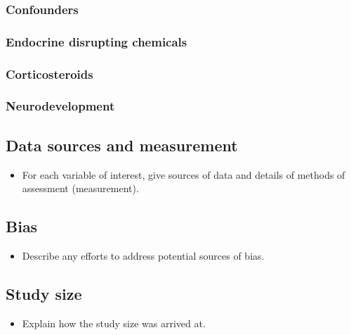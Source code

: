 \documentclass[
  letterpaper,
  DIV=11,
  numbers=noendperiod]{scrartcl}
\providecommand{\tightlist}{%
  \setlength{\itemsep}{0pt}\setlength{\parskip}{0pt}}\usepackage{longtable,booktabs,array}
\begin{document}
\hypertarget{sec-confounders}{%
\subsubsection{Confounders}\label{sec-confounders}}

\hypertarget{sec-edcs}{%
\subsubsection{Endocrine disrupting chemicals}\label{sec-edcs}}

\hypertarget{sec-steroids}{%
\subsubsection{Corticosteroids}\label{sec-steroids}}

\hypertarget{sec-neurodevelopment}{%
\subsubsection{Neurodevelopment}\label{sec-neurodevelopment}}

\hypertarget{sec-dat-sources}{%
\subsection{Data sources and measurement}\label{sec-dat-sources}}

\begin{itemize}
\tightlist
\item
  For each variable of interest, give sources of data and details of
  methods of assessment (measurement).
\end{itemize}

\hypertarget{sec-bias}{%
\subsection{Bias}\label{sec-bias}}

\begin{itemize}
\tightlist
\item
  Describe any efforts to address potential sources of bias.
\end{itemize}

\hypertarget{sec-size}{%
\subsection{Study size}\label{sec-size}}

\begin{itemize}
\tightlist
\item
  Explain how the study size was arrived at.
\end{itemize}
\end{document}
